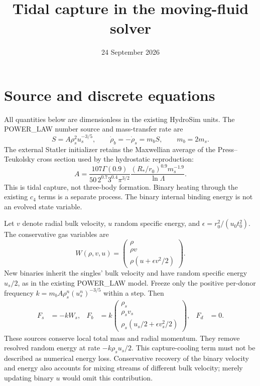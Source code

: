 \documentclass[11pt]{article}
\title{Tidal capture in the moving-fluid solver}
\author{}
\date{24 September 2026}
\begin{document}
\maketitle
\section{Source and discrete equations}
All quantities below are dimensionless in the existing HydroSim units.
The POWER\_LAW number source and mass-transfer rate are
\begin{equation}
 S=A\rho_s^2u_s^{-3/5},\qquad \dot\rho_b=-\dot\rho_s=m_b S,
 \qquad m_b=2m_s.
\end{equation}
The external Statler initializer retains the Maxwellian average of the
Press--Teukolsky cross section used by the hydrostatic reproduction:
\begin{equation}
 A=\frac{107\Gamma(0.9)}{50\,2^{0.7}3^{0.4}\pi^{3/2}}
 \frac{(R_*/r_0)^{0.9}m_s^{-1.9}}{\ln\Lambda}.
\end{equation}
This is tidal capture, not three-body formation. Binary heating through
the existing $c_4$ terms is a separate process. The binary internal binding
energy is not an evolved state variable.

Let $v$ denote radial bulk velocity, $u$ random specific energy, and
$\epsilon=r_0^2/(u_0t_0^2)$. The conservative gas variables are
\begin{equation}
 W(\rho,v,u)=\begin{pmatrix}\rho\\\rho v\\\rho(u+\epsilon v^2/2)\end{pmatrix}.
\end{equation}
New binaries inherit the singles' bulk velocity and have random specific
energy $u_s/2$, as in the existing POWER\_LAW model. Freeze only the positive
per-donor frequency $k=m_b A\rho_s^n(u_s^n)^{-3/5}$ within a step. Then
\begin{align}
 F_s&=-kW_s,&
 F_b&=k\begin{pmatrix}\rho_s\\\rho_s v_s\\\rho_s(u_s/2+\epsilon v_s^2/2)\end{pmatrix},&F_d&=0.
\end{align}
These sources conserve local total mass and radial momentum. They remove
resolved random energy at rate $-k\rho_su_s/2$. This capture-cooling term
must not be described as numerical energy loss. Conservative recovery of
the binary velocity and energy also accounts for mixing streams of different
bulk velocity; merely updating binary $u$ would omit this contribution.
\end{document}
